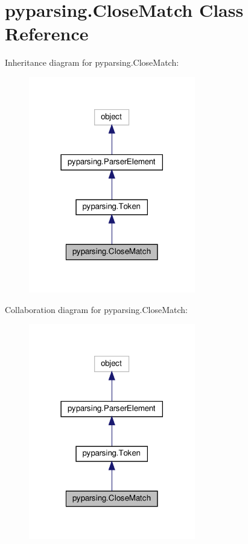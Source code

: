 \hypertarget{classpyparsing_1_1CloseMatch}{}\section{pyparsing.\+Close\+Match Class Reference}
\label{classpyparsing_1_1CloseMatch}


Inheritance diagram for pyparsing.\+Close\+Match\+:
\nopagebreak
\begin{figure}[H]
\begin{center}
\leavevmode
\includegraphics[width=206pt]{classpyparsing_1_1CloseMatch__inherit__graph}
\end{center}
\end{figure}


Collaboration diagram for pyparsing.\+Close\+Match\+:
\nopagebreak
\begin{figure}[H]
\begin{center}
\leavevmode
\includegraphics[width=206pt]{classpyparsing_1_1CloseMatch__coll__graph}
\end{center}
\end{figure}
